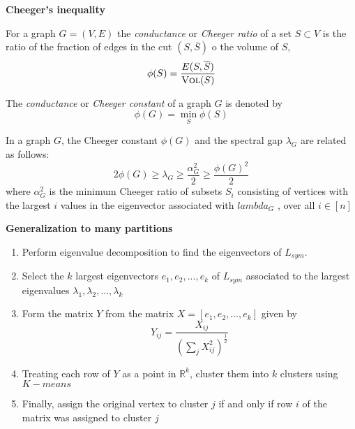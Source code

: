 \textbf{Cheeger's inequality}

For a graph $G=(V,E)$ the \textit{conductance} or \textit{Cheeger ratio} of a set $S\subset V$ is the ratio of the fraction of edges in the cut $(S,\overline{S})$ o the volume of $S$,
\begin{displaymath}
	\phi(S) = \frac{E(S,\overline{S})}{\textsc{Vol}(S)}
\end{displaymath}

The \textit{conductance} or \textit{Cheeger constant} of a graph $G$ is denoted by 
\begin{displaymath}
	\phi(G) = \min_S \phi(S)
\end{displaymath}

\begin{theorem}
	In a graph $G$, the Cheeger constant $\phi(G)$ and the spectral gap $\lambda_G$ are related as follows:
	\begin{displaymath}
		2\phi(G)\geq \lambda_G \geq \frac{\alpha_G^2}{2} \geq \frac{\phi(G)^2}{2} 
	\end{displaymath}
	where $\alpha_G^2$ is the minimum Cheeger ratio of subsets $S_i$ consisting of vertices with the largest $i$ values in the eigenvector associated with $lambda_G$ , over all $i\in[n]$
\end{theorem}

\textbf{Generalization to many partitions}
\begin{enumerate}
	\item Perform eigenvalue decomposition to find the eigenvectors of $L_{sym}$.
	\item Select the $k$ largest eigenvectors $e_1, e_2, ..., e_k$ of $L_{sym}$ associated to the largest eigenvalues $\lambda_1, \lambda_2, ..., \lambda_k$
	\item Form the matrix $Y$ from the matrix $X=[e_1, e_2,..., e_k]$ given by 
	\begin{displaymath}
		Y_{ij} = \frac{X_{ij}}{\left(\sum_j X_{ij}^2\right)^\frac{1}{2}}
	\end{displaymath}
	\item Treating each row of $Y$ as a point in $\mathbb R^k$, cluster them into $k$ clusters using $K-means$
	\item Finally, assign the original vertex to cluster $j$ if and only if row $i$ of the matrix was assigned to cluster $j$
\end{enumerate}


